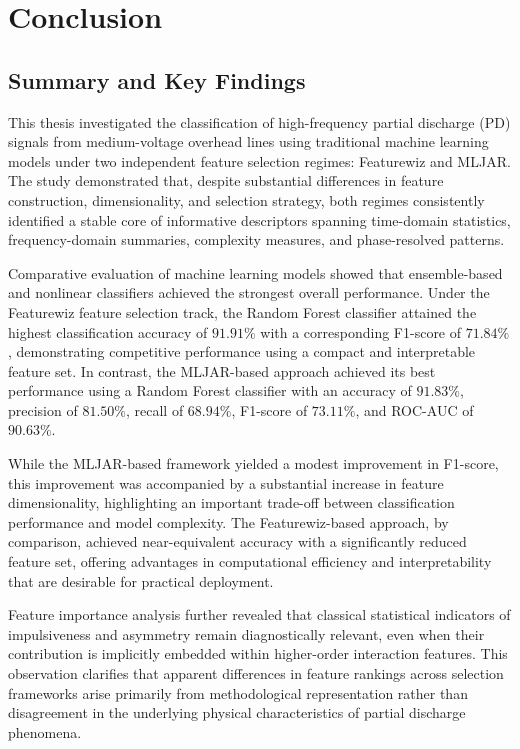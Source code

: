 \chapter{Conclusion}

\section{Summary and Key Findings}

This thesis investigated the classification of high-frequency partial discharge (PD) signals from medium-voltage overhead lines using traditional machine learning models under two independent feature selection regimes: Featurewiz and MLJAR. The study demonstrated that, despite substantial differences in feature construction, dimensionality, and selection strategy, both regimes consistently identified a stable core of informative descriptors spanning time-domain statistics, frequency-domain summaries, complexity measures, and phase-resolved patterns.

Comparative evaluation of machine learning models showed that ensemble-based and nonlinear classifiers achieved the strongest overall performance. Under the Featurewiz feature selection track, the Random Forest classifier attained the highest classification accuracy of $91.91\%$ with a corresponding F1-score of $71.84\%$, demonstrating competitive performance using a compact and interpretable feature set. In contrast, the MLJAR-based approach achieved its best performance using a Random Forest classifier with an accuracy of $91.83\%$, precision of $81.50\%$, recall of $68.94\%$, F1-score of $73.11\%$, and ROC-AUC of $90.63\%$.

While the MLJAR-based framework yielded a modest improvement in F1-score, this improvement was accompanied by a substantial increase in feature dimensionality, highlighting an important trade-off between classification performance and model complexity. The Featurewiz-based approach, by comparison, achieved near-equivalent accuracy with a significantly reduced feature set, offering advantages in computational efficiency and interpretability that are desirable for practical deployment.

Feature importance analysis further revealed that classical statistical indicators of impulsiveness and asymmetry remain diagnostically relevant, even when their contribution is implicitly embedded within higher-order interaction features. This observation clarifies that apparent differences in feature rankings across selection frameworks arise primarily from methodological representation rather than disagreement in the underlying physical characteristics of partial discharge phenomena.

